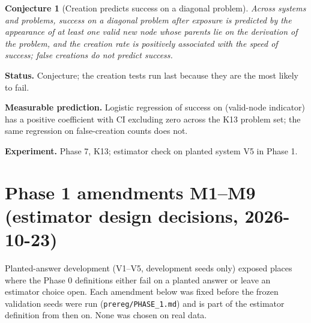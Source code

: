 \documentclass[11pt]{article}
\theoremstyle{definition}
\theoremstyle{plain}
\newtheorem{conjecture}[definition]{Conjecture}
\theoremstyle{remark}
\newcommand{\status}[1]{\par\noindent\textbf{Status.} #1}
\newcommand{\predict}[1]{\par\noindent\textbf{Measurable prediction.} #1}
\newcommand{\experiment}[1]{\par\noindent\textbf{Experiment.} #1\par\medskip}
\begin{document}
\begin{conjecture}[Creation predicts success on a diagonal problem]
\label{conj:creation}
Across systems and problems, success on a diagonal problem after exposure is
predicted by the appearance of at least one valid new node whose parents lie
on the derivation of the problem, and the creation rate is positively
associated with the speed of success; false creations do not predict success.
\end{conjecture}
\status{Conjecture; the creation tests run last because they are the most
likely to fail.}
\predict{Logistic regression of success on (valid-node indicator) has a
positive coefficient with CI excluding zero across the K13 problem set; the
same regression on false-creation counts does not.}
\experiment{Phase 7, K13; estimator check on planted system V5 in Phase 1.}


\section{Phase 1 amendments M1--M9 (estimator design decisions, 2026-10-23)}
\label{sec:amend}

Planted-answer development (V1--V5, development seeds only) exposed places
where the Phase 0 definitions either fail on a planted answer or leave an
estimator choice open. Each amendment below was fixed before the frozen
validation seeds were run (\texttt{prereg/PHASE\_1.md}) and is part of the
estimator definition from then on. None was chosen on real data.
\end{document}
